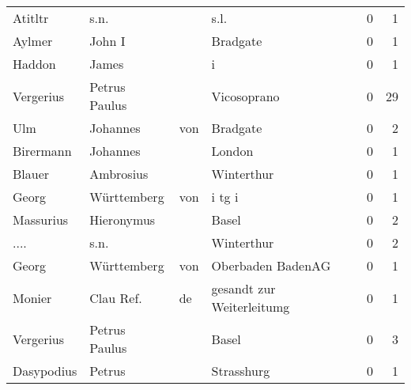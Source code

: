 \begin{center}
\begin{tiny}
\begin{longtabu}{llllrr}
                  Atitltr &                               s.n. &             &                                        s.l. &          0 &         1 \\
                   Aylmer &                             John I &             &                                    Bradgate &          0 &         1 \\
                   Haddon &                              James &             &                                           i &          0 &         1 \\
                Vergerius &                      Petrus Paulus &             &                                 Vicosoprano &          0 &        29 \\
                      Ulm &                           Johannes &         von &                                    Bradgate &          0 &         2 \\
                Birermann &                           Johannes &             &                                      London &          0 &         1 \\
                   Blauer &                          Ambrosius &             &                                  Winterthur &          0 &         1 \\
                    Georg &                        Württemberg &         von &                                      i tg i &          0 &         1 \\
                Massurius &                         Hieronymus &             &                                       Basel &          0 &         2 \\
                     .... &                               s.n. &             &                                  Winterthur &          0 &         2 \\
                    Georg &                        Württemberg &         von &                           Oberbaden BadenAG &          0 &         1 \\
                   Monier &                          Clau Ref. &          de &                   gesandt zur Weiterleitumg &          0 &         1 \\
                Vergerius &                      Petrus Paulus &             &                                       Basel &          0 &         3 \\
               Dasypodius &                             Petrus &             &                                  Strasshurg &          0 &         1 \\

\end{longtabu}
\end{tiny}
\end{center}
